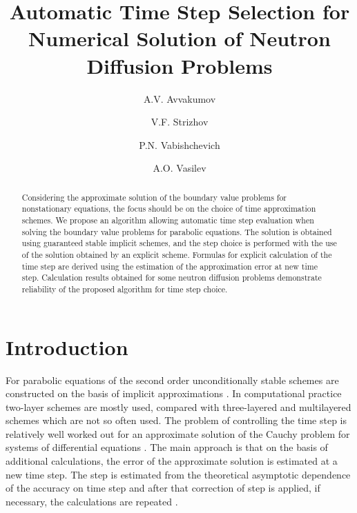\documentclass[runningheads]{llncs}
\begin{document}
%
\title{Automatic Time Step Selection for Numerical Solution of Neutron Diffusion Problems}
%
%
\author{A.V. Avvakumov \and
V.F. Strizhov\and
P.N. Vabishchevich\and
A.O. Vasilev}
%
%
%
\maketitle              %
%
\begin{abstract}
Considering the approximate solution of the boundary value problems for nonstationary equations, the focus should be on the choice of time approximation schemes. 
We propose an algorithm allowing automatic time step evaluation when solving the boundary value problems	for parabolic equations.
The solution is obtained using guaranteed stable implicit schemes, and the step choice is performed with the use of the solution obtained by an explicit scheme.
Formulas for explicit calculation of the time step are derived using the estimation of the approximation error at new time step.
Calculation results obtained for some neutron diffusion problems demonstrate reliability of the proposed algorithm for time step choice. 

\end{abstract}

\section{Introduction}
For parabolic equations of the second order unconditionally stable schemes are constructed on the basis of implicit approximations \cite{Matus}.
In computational practice two-layer schemes are mostly used, compared with three-layered and multilayered schemes which are not so often used.
The problem of controlling the time step is relatively well worked out for an approximate solution of the Cauchy problem for systems of differential equations \cite{Ascher}. 
The main approach is that on the basis of additional calculations, the error of the approximate solution is estimated at a new time step. 
The step is estimated from the theoretical asymptotic dependence of the accuracy on time step and after that correction of step is applied, if necessary, the calculations are repeated \cite{Vabishchevich}.
\end{document}
